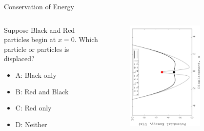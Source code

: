 \documentclass{beamer}
\begin{document}
\begin{frame}{Conservation of Energy}
\begin{columns}[T]
\begin{column}{0.3\textwidth}
\small
Suppose Black and Red particles begin at $x=0$. Which particle or particles is displaced?
\begin{itemize}
\item A: Black only
\item B: Red and Black
\item C: Red only
\item D: Neither
\end{itemize}
\end{column}
\begin{column}{0.7\textwidth}
\begin{figure}
\centering
\includegraphics[width=0.7\textwidth,angle=270]{figures/Nov14_plot2.jpg}
\end{figure}
\end{column}
\end{columns}
\end{frame}
\end{document}
